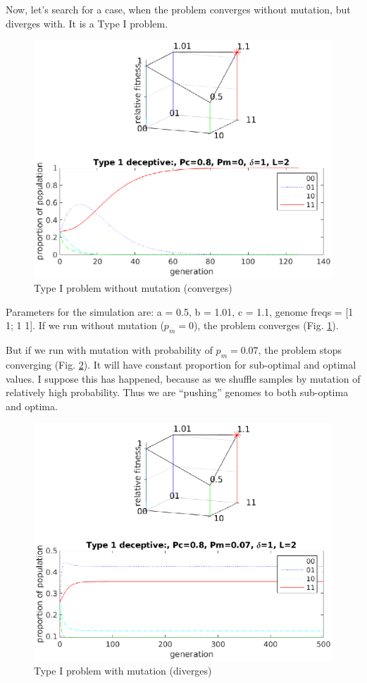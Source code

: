 \documentclass[12pt, a4paper]{article}
\begin{document}
    Now, let's search for a case, when the problem converges
    without mutation, but diverges with. It is a Type I problem.
    \begin{figure}[H]
    \centering
        \includegraphics[width=0.8\linewidth]{pics/type1_ok.eps}
        \caption{Type I problem without mutation (converges)}
        \label{fig:t1_no_mut}
    \end{figure}
    Parameters for the simulation are: a = 0.5, b = 1.01, c = 1.1, genome
    freqs = [1 1; 1 1]. If we run without mutation ($p_m = 0$), the problem
    converges (Fig. \ref{fig:t1_no_mut}).

    But if we run with mutation with probability of $p_m = 0.07$, the problem
    stops converging (Fig. \ref{fig:t1_w_mut}). It will have constant proportion
    for sub-optimal and optimal values. I suppose this has happened, because as
    we shuffle samples by mutation of relatively high probability. Thus we are
    ``pushing'' genomes to both sub-optima and optima.
    \begin{figure}[H]
    \centering
        \includegraphics[width=0.8\linewidth]{pics/type1_fail.eps}
        \caption{Type I problem with mutation (diverges)}
        \label{fig:t1_w_mut}
    \end{figure}
\end{document}
